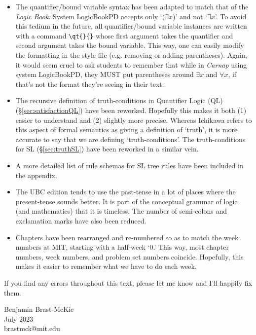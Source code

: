 \begin{itemize}
\item The quantifier/bound variable syntax has been adapted to match that of the \textit{Logic Book}.
  System LogicBookPD accepts only `$(\exists x$)' and not `$\exists x$'.
  To avoid this tedium in the future, all quantifier/bound variable instances are written with a command \verb|\qt{}{}| whose first argument takes the quantifier and second argument takes the bound variable.
  This way, one can easily modify the formatting in the style file (e.g. removing or adding parentheses).
  Again, it would seem cruel to ask students to remember that while in \textit{Carnap} using system LogicBookPD, they MUST put parentheses around $\exists x$ and $\forall x$, if that's not the format they're seeing in their text.

\item The recursive definition of truth-conditions in Quantifier Logic (QL) (\S\ref{sec:satisfactionQL}) have been reworked.
  Hopefully this makes it both (1) easier to understand and (2) slightly more precise.
  Whereas Ichikawa refers to this aspect of formal semantics as giving a definition of `truth', it is more accurate to say that we are defining `truth-conditions'.
  The truth-conditions for SL (\S\ref{sec:truthSL}) have been reworked in a similar vein.

\item A more detailed list of rule schemas for SL tree rules have been included in the appendix. 

\item The UBC edition tends to use the past-tense in a lot of places where the present-tense sounds better.
  It is part of the conceptual grammar of logic (and mathematics) that it is timeless. 
  The number of semi-colons and exclamation marks have also been reduced.

\item Chapters have been rearranged and re-numbered so as to match the week numbers at MIT, starting with a half-week `0.'
  This way, most chapter numbers, week numbers, and problem set numbers coincide.
  Hopefully, this makes it easier to remember what we have to do each week.

\end{itemize}

If you find any errors throughout this text, please let me know and I'll happily fix them.

\begin{flushright}
Benjamin Brast-McKie \\
July 2023 \\
brastmck@mit.edu
\end{flushright}


